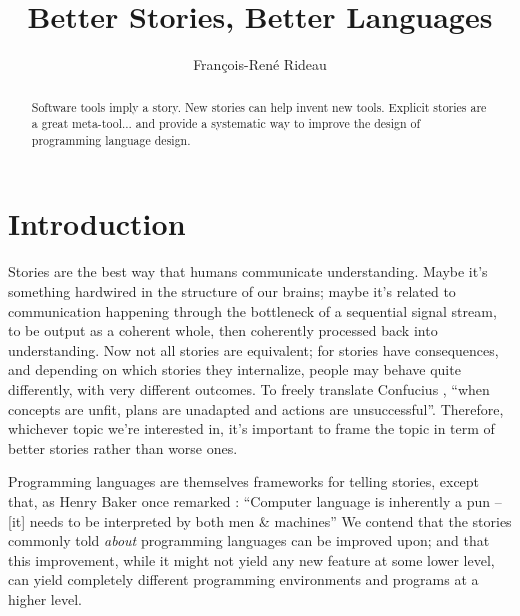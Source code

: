 \documentclass[a4paper,UKenglish]{lipics}
\title{Better Stories, Better Languages}
\author{François-René Rideau}
\affil{TUNES Project\\
  \texttt{fare@tunes.org}}
\begin{document}
\newcommand{\Sad}{Sad...}
\newcommand{\Rad}{Better!}
\newcommand{\Krad}{Even better!}
\newcommand{\proglang}{programming language}
\newcommand{\proglangs}{programming languages}
\newcommand{\PL}{Programming Language}
\newcommand{\SadBetter}[3]{\subsection{#1} \par #2 \par #3 \par}
\newcommand{\SadBetterEvenBetter}[4]{\subsection{#1} \par #2 \par #3 \par #4 \par}

\maketitle

\begin{abstract}
  Software tools imply a story.
  New stories can help invent new tools.
  Explicit stories are a great meta-tool...
  and provide a systematic way to improve
  the design of programming language design.
\end{abstract}

\section{Introduction}

Stories are the best way that humans communicate understanding.
Maybe it's something hardwired in the structure of our brains;
maybe it's related to communication happening
through the bottleneck of a sequential signal stream,
to be output as a coherent whole,
then coherently processed back into understanding.
Now not all stories are equivalent; for stories have consequences,
and depending on which stories they internalize,
people may behave quite differently, with very different outcomes.
To freely translate Confucius \cite{Analects},
``when concepts are unfit, plans are unadapted and actions are unsuccessful''.
Therefore, whichever topic we're interested in,
it's important to frame the topic in term of better stories rather than worse ones.

Programming languages are themselves frameworks for telling stories,
except that, as Henry Baker once remarked \cite{HBaker2005}:
``Computer language is inherently a pun – [it] needs to be interpreted by both men \& machines''
We contend that the stories commonly told \emph{about} programming languages can be improved upon;
and that this improvement, while it might not yield any new feature at some lower level,
can yield completely different programming environments and programs at a higher level.
\end{document}
